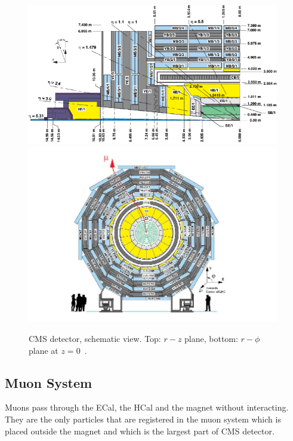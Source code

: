 \begin{figure}[htb]
  \begin{center}
    {\includegraphics[width=0.98\textwidth]{../figs/Exp/CMSview1.png}\\
     \includegraphics[width=0.98\textwidth]{../figs/Exp/CMSview.png}}
    \caption{CMS detector, schematic view. Top: $r-z$ plane, bottom: $r-\phi$ plane at $z=0$~\cite{ref_CMSschemView}. }
    \label{fig:CMSschemView}
  \end{center}
\end{figure}


\subsection{Muon System}

Muons pass through the ECal, the HCal and the magnet without interacting. They are the only particles that are registered in the muon system which is placed outside the magnet and which is the largest part of CMS detector.

